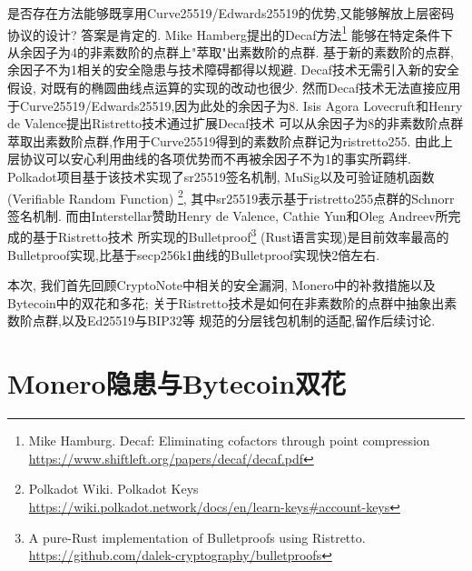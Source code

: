 \documentclass{article}
\begin{document}
是否存在方法能够既享用Curve25519/Edwards25519的优势,又能够解放上层密码协议的设计?
答案是肯定的. Mike Hamberg提出的Decaf方法\footnote{
Mike Hamburg. Decaf: Eliminating cofactors through point compression \\
\phantom{xxxx}\url{https://www.shiftleft.org/papers/decaf/decaf.pdf}}
能够在特定条件下从余因子为4的非素数阶的点群上"萃取"出素数阶的点群.
基于新的素数阶的点群,余因子不为1相关的安全隐患与技术障碍都得以规避.
Decaf技术无需引入新的安全假设, 对既有的椭圆曲线点运算的实现的改动也很少.
然而Decaf技术无法直接应用于Curve25519/Edwards25519,因为此处的余因子为8.
Isis Agora Lovecruft和Henry de Valence提出Ristretto技术通过扩展Decaf技术
可以从余因子为8的非素数阶点群萃取出素数阶点群,作用于Curve25519得到的素数阶点群记为ristretto255.
由此上层协议可以安心利用曲线的各项优势而不再被余因子不为1的事实所羁绊.
Polkadot项目基于该技术实现了sr25519签名机制, MuSig以及可验证随机函数(Verifiable Random Function)
\footnote{Polkadot Wiki. Polkadot Keys \\
\phantom{xxxx}\url{https://wiki.polkadot.network/docs/en/learn-keys\#account-keys}}, 
其中sr25519表示基于ristretto255点群的Schnorr签名机制.
而由Interstellar赞助Henry de Valence, Cathie Yun和Oleg Andreev所完成的基于Ristretto技术
所实现的Bulletproof\footnote{
A pure-Rust implementation of Bulletproofs using Ristretto.\\
\phantom{xxxx}\url{https://github.com/dalek-cryptography/bulletproofs}}
(Rust语言实现)是目前效率最高的Bulletproof实现,比基于secp256k1曲线的Bulletproof实现快2倍左右.

本次, 我们首先回顾CryptoNote中相关的安全漏洞, Monero中的补救措施以及Bytecoin中的双花和多花;
关于Ristretto技术是如何在非素数阶的点群中抽象出素数阶点群,以及Ed25519与BIP32等
规范的分层钱包机制的适配,留作后续讨论.

\section{Monero隐患与Bytecoin双花}
\end{document}

